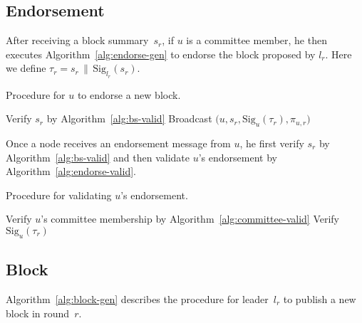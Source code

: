 \documentclass{article}
\begin{document}
\subsection{Endorsement}

After receiving a block summary~$s_r$, if $u$ is a committee member, he then executes Algorithm~\ref{alg:endorse-gen} to endorse the block proposed by $l_r$. Here we define $\tau_r=s_r\,\|\,\textrm{Sig}_{l_r}(s_r)$.

\begin{algorithm}[H]
\caption{Procedure for $u$ to endorse a new block.}
\label{alg:endorse-gen}
\begin{spacing}{1.2}
\begin{algorithmic}[1]
    \vspace{1ex}
    \State Verify $s_r$ by Algorithm~\ref{alg:bs-valid}
    \State Broadcast $\Big(u,s_r,\textrm{Sig}_u(\tau_r),\pi_{u,r}\Big)$
\end{algorithmic}
\end{spacing}
\end{algorithm}

Once a node receives an endorsement message from $u$, he first verify $s_r$ by Algorithm~\ref{alg:bs-valid} and then validate $u$'s endorsement by Algorithm~\ref{alg:endorse-valid}.

\begin{algorithm}[H]
\caption{Procedure for validating $u$'s endorsement.}
\label{alg:endorse-valid}
\begin{spacing}{1.2}
\begin{algorithmic}[1]
    \vspace{1ex}
    \State Verify $u$'s committee membership by Algorithm~\ref{alg:committee-valid}
    \State Verify $\textrm{Sig}_{u}(\tau_r)$
\end{algorithmic}
\end{spacing}
\end{algorithm}

\subsection{Block}

Algorithm~\ref{alg:block-gen} describes the procedure for leader~$l_r$ to publish a new block in round~$r$.
\end{document}
